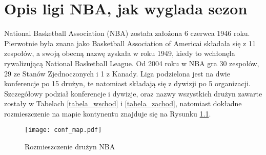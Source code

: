 \documentclass[inzynierska]{pwr_wmat_praca_dyplomowa}
\theoremstyle{plain}
\numberwithin{theorem}{chapter}
\theoremstyle{definition}
\numberwithin{theorem}{chapter}
\begin{document}
\chapter{Opis ligi NBA, jak wyglada sezon}\label{rodzial1}
National Basketball Association (NBA) została założona 6 czerwca 1946 roku. Pierwotnie była znana jako Basketball Association of Americai składała się z 11 zespołów, a swoją obecną nazwę zyskała w roku 1949, kiedy to wchłonęła rywalizującą National Basketball League. Od 2004 roku w NBA gra 30 zespołów, 29 ze Stanów Zjednoczonych i 1 z Kanady. Liga podzielona jest na dwie konferencje po 15 drużyn, te natomiast składają się z dywizji po 5 organizacji. Szczegółowy podział konferencje i dywizje, oraz nazwy wszystkich drużyn zawarte zostały w Tabelach \ref{tabela_wschod} i \ref{tabela_zachod}, natomiast dokładne rozmieszczenie na mapie kontynentu znajduje się na Rysunku \ref{mapa_stany}.

\begin{figure}[t]
	\texttt{[image: conf\_map.pdf]}
	\caption{Rozmieszczenie drużyn NBA}\label{mapa_stany}
	\centering
\end{figure}
\end{document}
